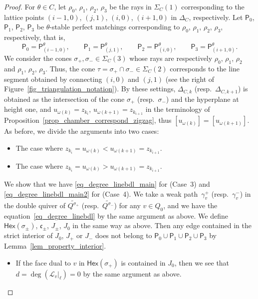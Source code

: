 \documentclass[10pt,a4paper]{amsart}
\numberwithin{equation}{section}
\theoremstyle{definition}
\newcommand{\calL}{\mathcal{L}}
\newcommand{\fkc}{\mathfrak{c}}
\newcommand{\sfP}{\mathsf{P}}
\newcommand{\Hex}{\mathsf{Hex}}
\newcommand{\permII}{\omega}
\begin{document}
\begin{proof}
For $\theta\in C$, let $\rho_0$, $\rho_1$, $\rho_2$, $\rho_3$ be the rays in $\Sigma_C(1)$ corresponding to the lattice points
$(i-1,0)$, $(j,1)$, $(i,0)$, $(i+1,0)$ in $\Delta_C$, respectively.
Let $\sfP_0$, $\sfP_1$, $\sfP_2$, $\sfP_3$ be $\theta$-stable perfect matchings corresponding to $\rho_0$, $\rho_1$, $\rho_2$, $\rho_3$, respectively,
that is,
\[
\sfP_0=\sfP_{(i-1,0)}^\theta, \qquad \sfP_1=\sfP_{(j,1)}^\theta, \qquad \sfP_2=\sfP_{(i,0)}^\theta, \qquad \sfP_3=\sfP_{(i+1,0)}^\theta.
\]
We consider the cones $\sigma_+, \sigma_-\in\Sigma_C(3)$ whose rays are respectively $\rho_0$, $\rho_1$, $\rho_2$ and $\rho_1$, $\rho_2$, $\rho_3$.
Thus, the cone $\tau=\sigma_+\cap\sigma_-\in\Sigma_C(2)$ corresponds to the line segment obtained by connecting $(i,0)$ and $(j,1)$
 (see the right of Figure~\ref{fig_triangulation_notation}).
By these settings, $\Delta_{C,k}$ (resp.\ $\Delta_{C,k+1}$) is obtained as the intersection of the cone $\sigma_+$ (resp.\ $\sigma_-$) and the hyperplane at height one,
and $u_{\permII(k)}=z_{k_i}$, $u_{\permII(k+1)}=z_{k_{i+1}}$ in the terminology of Proposition~\ref{prop_chamber_correspond_zigzag},
thus $[u_{\permII(k)}]= [u_{\permII(k+1)}]$. As before, we divide the arguments into two cases:
\begin{itemize}\setlength{\leftskip}{1cm}\itemsep=0pt
\item[(Case 3)] The case where $z_{k_i}=u_{\permII(k)}<u_{\permII(k+1)}=z_{k_{i+1}}$.
\item[(Case 4)] The case where $z_{k_i}=u_{\permII(k)}>u_{\permII(k+1)}=z_{k_{i+1}}$.
\end{itemize}
We show that we have \eqref{eq_degree_linebdl_main} for (Case~3) and \eqref{eq_degree_linebdl_main2} for (Case~4).
We take a weak path~$\gamma_v^+$ (resp.~$\gamma_v^-$) in the double quiver of $\widetilde{Q^{\sigma_+}}$ (resp.\ $\widetilde{Q^{\sigma_-}}$) for any $v\in Q_0$,
and we have the equation~\eqref{eq_degree_linebdl} by the same argument as above.
We define $\Hex(\sigma_\pm)$, $\fkc_\pm$, $J_\pm$, $J_0$ in the same way as above.
Then any edge contained in the strict interior of $J_0$, $J_+$ or $J_-$ does not belong to $\sfP_0\cup \sfP_1\cup \sfP_2\cup \sfP_3$
by Lemma~\ref{lem_property_interior}.
\begin{itemize}\itemsep=0pt
\item If the face dual to $v$ in $\Hex(\sigma_+)$ is contained in $J_0$, then we see that $d=\deg(\calL_v |_\ell)=0$ by the same argument as above.

\end{itemize}
\end{proof}
\end{document}
